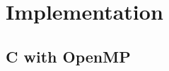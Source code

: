 \documentclass[11pt]{article} %
\begin{document}
\section{Implementation}


\subsection{C with OpenMP}

\end{document}
